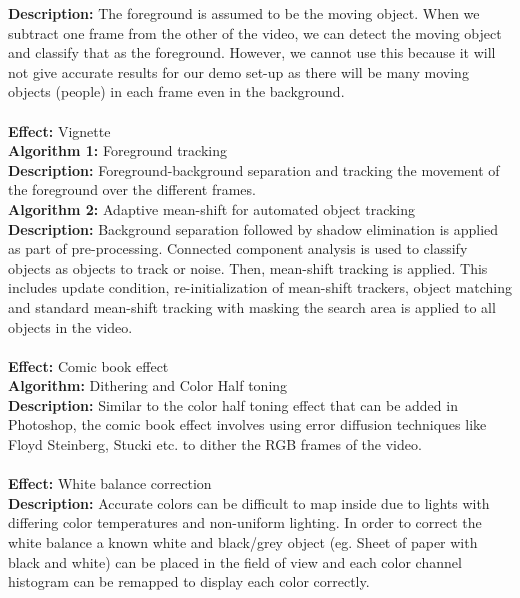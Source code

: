 \documentclass{article}
\begin{document}
{\bf{Description:}} The foreground is assumed to be the moving object. When we subtract one frame from the other of the video, we can detect the moving object and classify that as the foreground. However, we cannot use this because it will not give accurate results for our demo set-up as there will be many moving objects (people) in each frame even in the background.\\\\
{\bf{Effect:}} Vignette\\
{\bf{Algorithm 1:}} Foreground tracking \\	
{\bf{Description:}} Foreground-background separation and tracking the movement of the foreground over the different frames.\\
{\bf{Algorithm 2:}} Adaptive mean-shift for automated object tracking\\	
{\bf{Description:}} Background separation followed by shadow elimination is applied as part of pre-processing. Connected component analysis is used to classify objects as objects to track or noise. Then, mean-shift tracking is applied. This includes update condition, re-initialization of mean-shift trackers, object matching and standard mean-shift tracking with masking the search area is applied to all objects in the video.\cite{2}\cite{3}\cite{4}\\\\
{\bf{Effect:}} Comic book effect\\
{\bf{Algorithm:}} Dithering and Color Half toning\\	
{\bf{Description:}} Similar to the color half toning effect that can be added in Photoshop, the comic book effect involves using error diffusion techniques like Floyd Steinberg, Stucki etc. to dither the RGB frames of the video.\cite{5}\cite{6}\\\\
{\bf{Effect:}} White balance correction\\	
{\bf{Description:}} Accurate colors can be difficult to map inside due to lights with differing color temperatures and non-uniform lighting. In order to correct the white balance a known white and black/grey object (eg. Sheet of paper with black and white) can be placed in the field of view and each color channel histogram can be remapped to display each color correctly.\cite{13}\\\\
\end{document}
